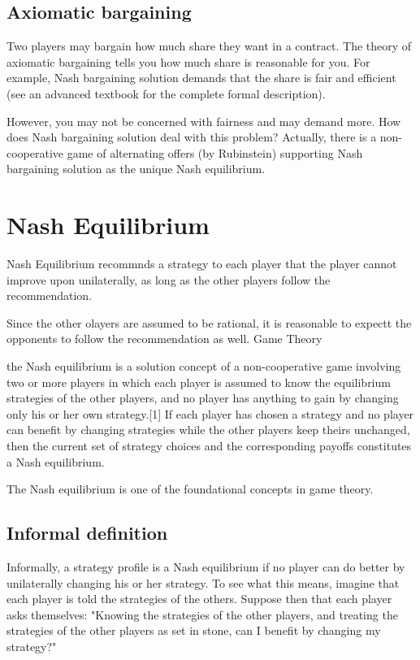 \documentclass[]{report}
\begin{document}
\subsection{Axiomatic bargaining}
Two players may bargain how much share they want in a contract. The theory of axiomatic bargaining tells you how much share is reasonable for you. For example, Nash bargaining solution demands that the share is fair and efficient (see an advanced textbook for the complete formal description).

However, you may not be concerned with fairness and may demand more. How does Nash bargaining solution deal with this problem? Actually, there is a non-cooperative game of alternating offers (by Rubinstein) supporting Nash bargaining solution as the unique Nash equilibrium.


\newpage
\section{Nash Equilibrium}

Nash Equilibrium recommnds a strategy to each player that the player cannot improve upon unilaterally, as long as the other players follow the recommendation.

Since the other olayers are assumed to be rational, it is reasonable to expectt the opponents to follow the recommendation as well.
Game Theory


the Nash equilibrium is a solution concept of a non-cooperative game involving two or more players in which each player is assumed to know the equilibrium strategies of the other players, and no player has anything to gain by changing only his or her own strategy.[1] If each player has chosen a strategy and no player can benefit by changing strategies while the other players keep theirs unchanged, then the current set of strategy choices and the corresponding payoffs constitutes a Nash equilibrium. 

The Nash equilibrium is one of the foundational concepts in game theory.



\subsection{Informal definition}
Informally, a strategy profile is a Nash equilibrium if no player can do better by unilaterally changing his or her strategy. To see what this means, imagine that each player is told the strategies of the others. Suppose then that each player asks themselves: "Knowing the strategies of the other players, and treating the strategies of the other players as set in stone, can I benefit by changing my strategy?"
\end{document}
